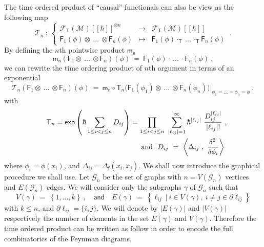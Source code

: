 \documentclass[12pt]{book}
\renewcommand{\exp}{\mathsf{exp}}
\newcommand{\abs}[1]{\left|#1\right|}
\newcommand{\sm}[1]{\left\langle#1\right\rangle}
\newcommand{\Fcal}{\mathcal{F}}
\newcommand{\Gcal}{\mathcal{G}}
\newcommand{\Mcal}{\mathcal{M}}
\newcommand{\Tcal}{\mathcal{T}}
\newcommand{\Fsf}{\mathsf{F}}
\newcommand{\Tsf}{\mathsf{T}}
\newcommand{\fsf}{\mathsf{f}}
\newcommand{\msf}{\mathsf{m}}
\newcommand{\nsf}{\mathsf{n}}
\theoremstyle{break}
\begin{document}
The  time ordered product of ``causal'' functionals can also be view as the following map
%
\begin{equation}
\Tcal_n \ : \ 
\left\{
\begin{array}{lcl}
\Fcal_\Tsf(\Mcal)[[\hbar]]^{\otimes n} & \to & \Fcal_\Tsf(\Mcal)[[\hbar]] \\
\Fsf_1(\phi) \otimes \ ... \ \otimes \Fsf_n(\phi) & \mapsto & \Fsf_1(\phi) \cdot_{\Tsf} \ ... \ \cdot_{\Tsf} \Fsf_n(\phi)
\end{array}
\right. \ .
\label{eq:time_ordered_op}
\end{equation}
%
By defining the $n$th pointwise product $\msf_\nsf$
%
\begin{equation*}
\msf_\nsf \left( \Fsf_1 \otimes \ ... \ \otimes \Fsf_n \right)(\phi) \ = \ \Fsf_1(\phi) \cdot \ ... \ \cdot \Fsf_n(\phi) \ ,
\end{equation*}
%
we can rewrite the time ordering product of $n$th argument in terms of an exponential
%
\begin{equation*}
\Tcal_n (\Fsf_1 \otimes \ ... \ \otimes \Fsf_n)(\phi) \ = \ \msf_\nsf \circ \Tsf_n \bigg( \Fsf_1(\phi_1) \otimes \ ... \ \otimes \Fsf_n(\phi_n) \bigg) \bigg|_{\phi_1 = ... = \phi_n = \phi} \ ,
\end{equation*}
%
with 
%
\begin{eqnarray*}
&&\Tsf_n = \exp\left(\hbar \sum_{1 \leq i < j \leq n} D_{ij}\right) =
\prod_{1 \leq i < j \leq n} \ \sum_{\abs{\ell_{ij}}=1}^\infty \hbar^{\abs{\ell_{ij}}} \ \frac{D_{ij}^{\abs{\ell_{ij}}}}{\abs{\ell_{ij}} !} \ , \\
&& \mbox{ and } \ D_{ij} \ = \ \sm{\Delta_{ij} \ , \ \frac{\delta^2 \hfil}{\delta \phi_i} } \ 
\end{eqnarray*}
%
where $\phi_i = \phi(x_i)$, and $\Delta_{ij}=\Delta_\fsf(x_i,x_j)$. We shall now introduce the graphical procedure we shall use. Let $\Gcal_n$ be the set of graphs with $n=V(\Gcal_n)$ vertices and $E(\Gcal_n)$ edges. We will consider only the subgraphs $\gamma$ of $\Gcal_n$ such that
%
\begin{equation*}
V(\gamma) \ = \ \left\{ 1, ... , k \right\} \ , \quad \mathsf{and} \quad E(\gamma) \ = \ \left\{ \ell_{ij} \ | \  i \in V(\gamma) , \ i\neq j \in \partial \ell_{ij} \right\}
\end{equation*}
%
with $k\leq n$, and $\partial \ell_{ij} = \{i,j\}$. We will denote by $\abs{E(\gamma)}$ and $\abs{V(\gamma)}$ respectively the number of elements in the set $E(\gamma)$ and $V(\gamma)$. Therefore the time ordered product can be written as follow in order to encode the full combinatorics of the Feynman diagrams,
\end{document}
